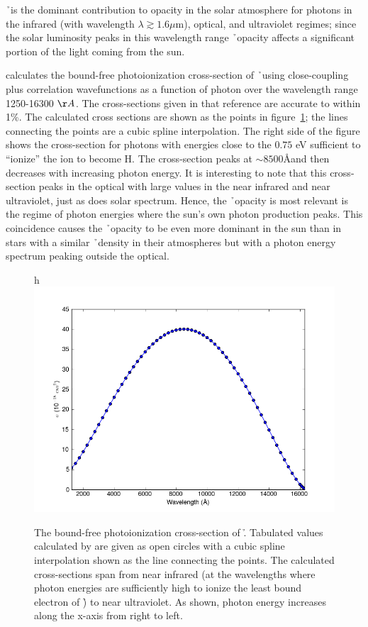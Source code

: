 \h\ is the dominant contribution to opacity in the solar atmosphere for photons in the infrared (with wavelength $\lambda \gtrsim 1.6 \mu$m), optical, and ultraviolet regimes; since the solar luminosity peaks in this wavelength range \h\ opacity affects a significant portion of the light coming from the sun.

\cite{wishart1979} calculates the bound-free photoionization
cross-section of \h\ using close-coupling plus correlation
wavefunctions as a function of photon
over the wavelength range 1250-16300 $\AA$.  The cross-sections given
in that reference are accurate to within 1\%.
The calculated cross sections are shown as the points in
figure~\ref{fig:bfcrosssection}; the lines connecting the points are a
cubic spline interpolation.  The right side of the figure shows the
cross-section for photons with energies close to the $0.75$ eV
sufficient to ``ionize'' the \h ion to become H.  The cross-section
peaks at $\sim 8500$\AA and then decreases with increasing photon
energy.  It is interesting to note that this cross-section peaks in
the optical with large values in the near infrared and near
ultraviolet, just as does solar spectrum.  Hence, the \h\ opacity is
most relevant is the regime of photon energies where the sun's own
photon production peaks.  This coincidence causes the \h\ opacity to
be even more dominant in the sun than in stars with a similar \h\
density in their atmospheres but with a photon energy spectrum peaking
outside the optical.
\begin{figure}{h}
\includegraphics[width=150mm]{figs/boundfree_crosssection.png}
\caption{\label{fig:bfcrosssection}The bound-free photoionization
cross-section of \h. Tabulated values calculated
by \cite{wishart1979} are given as open circles with a cubic spline
interpolation shown as the line connecting the points.  The calculated
cross-sections span from near infrared (at the wavelengths where photon
energies are sufficiently high to ionize the least bound electron
of \h) to near ultraviolet. As shown, photon energy increases along
the x-axis from right to left.}
\end{figure}

